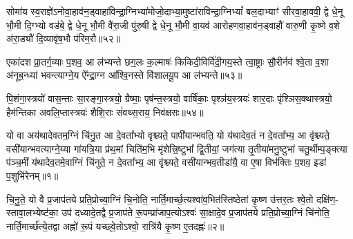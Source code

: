 सोमा॑य स्व॒राज्ञे॑\-ऽनोवा॒हाव॑न॒ड्वाहा॑विन्द्रा॒ग्निभ्या॑मोजो॒दाभ्या॒मुष्टा॑राविन्द्रा॒ग्नि\-भ्यां᳚ बल॒दाभ्याꣳ॑ सीरवा॒हाववी॒ द्वे धे॒नू भौ॒मी दि॒ग्भ्यो वड॑बे॒ द्वे धे॒नू भौ॒मी वै॑रा॒जी पु॑रु॒षी द्वे धे॒नू भौ॒मी वा॒यव॑ आरोहणवा॒हाव॑न॒ड्वाहौ॑ वारु॒णी कृ॒ष्णे व॒शे अ॑रा॒ड्यौ॑ दि॒व्यावृ॑ष॒भौ प॑रिम॒रौ॥५२॥

{\anuvakamend[{सोमा॑य स्व॒राज्ञे॒ चतु॑स्त्रिꣳशत्॥21॥}]}

एका॑दश प्रा॒तर्ग॒व्याः प॒शव॒ आ ल॑भ्यन्ते छग॒लः क॒ल्माषः॑ किकिदी॒विर्वि॑दी॒गय॒स्ते त्वा॒ष्ट्राः सौ॒रीर्नव॑ श्वे॒ता व॒शा अ॑नूब॒न्ध्या॑ भवन्त्याग्ने॒य ऐ᳚न्द्रा॒ग्न आ᳚श्वि॒नस्ते वि॑शालयू॒प आ ल॑भ्यन्ते॥५३॥

{\anuvakamend[{एका॑दश॒ पञ्च॑विꣳशतिः॥22॥}]}

पि॒शंगा॒स्त्रयो॑ वास॒न्ताः सा॒रङ्गा॒स्त्रयो॒ ग्रैष्माः॒ पृष॑न्त॒स्त्रयो॒ वार्\mbox{}षि॑काः॒ पृश्ञ॑य॒स्त्रयः॑ शार॒दाः पृ॑श्ञिस॒क्थास्त्रयो॒ हैम॑न्तिका अवलि॒प्तास्त्रयः॑ शैशि॒राः सं॑वथ्स॒राय॒ निव॑क्षसः॥५४॥


{\anuvakamend[{पि॒शङ्गा॑ विꣳश॒तिः॥23॥}]}

{}

\setcounter{anuvakam}{0}
यो वा अय॑थादेवतम॒ग्निं चि॑नु॒त आ दे॒वता᳚भ्यो वृश्च्यते॒ पापी॑यान्भवति॒ यो य॑थादेव॒तं न दे॒वता᳚भ्य॒ आ वृ॑श्च्यते॒ वसी॑यान्भवत्याग्ने॒य्या गा॑यत्रि॒या प्र॑थ॒मां चिति॑म॒भि मृ॑शेत्त्रि॒ष्टुभा᳚ द्वि॒तीयां॒ जग॑त्या तृ॒तीया॑मनु॒ष्टुभा॑ चतु॒र्थीम्प॒ङ्क्त्या प॑ञ्च॒मीं य॑थादेव॒तमे॒वाग्निं चि॑नुते॒ न दे॒वता᳚भ्य॒ आ वृ॑श्च्यते॒ वसी॑यान्भव॒तीडा॑यै॒ वा ए॒षा विभ॑क्तिः प॒शव॒ इडा॑ प॒शुभि॑रेनम्॥१॥

चि॒नु॒ते॒ यो वै प्र॒जाप॑तये प्रति॒प्रोच्या॒ग्निं चि॒नोति॒ नार्ति॒मार्च्छ॒त्यश्वा॑व॒भित॑स्तिष्ठेतां कृ॒ष्ण उ॑त्तर॒तः श्वे॒तो दक्षि॑ण॒- स्तावा॒लभ्येष्ट॑का॒ उप॑ दध्यादे॒तद्वै प्र॒जाप॑ते रू॒पम्प्रा॑जाप॒त्यो\-ऽश्वः॑ सा॒क्षादे॒व प्र॒जाप॑तये प्रति॒प्रोच्या॒ग्निं चि॑नोति॒ नार्ति॒मार्च्छ॑त्ये॒तद्वा अह्नो॑ रू॒पं यच्छ्वे॒तो\-ऽश्वो॒ रात्रि॑यै कृ॒ष्ण ए॒तदह्नः॑॥२॥

